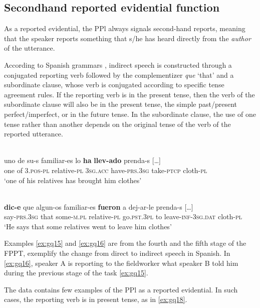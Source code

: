 \documentclass[output=paper]{langsci/langscibook}
\begin{document}
\subsection{Secondhand reported evidential function}\label{s:gq4-2}

As a reported evidential, the PPl always signals second-hand reports, meaning that the speaker reports something that s/he has heard directly from the \textit{author} of the utterance.

According to Spanish grammars \citep{Maldona1999}, indirect speech is constructed through a conjugated reporting verb followed by the complementizer \textit{que} ‘that’ and a subordinate clause, whose verb is conjugated according to specific tense agreement rules. If the reporting verb is in the present tense, then the verb of the subordinate clause will also be in the present tense, the simple past/present perfect/imperfect, or in the future tense. In the subordinate clause, the use of one tense rather than another depends on the original tense of the verb of the reported utterance.

\ea \label{ex:gq15}
\\
	\gll[…] uno de su-s familiar-es lo \textbf{ha} \textbf{llev-ado} prenda-s […]\\
	{} one of \textsc{3.pos}-\textsc{pl} relative-\textsc{pl} \textsc{3sg.acc} have-\textsc{prs.3sg} take-\textsc{ptcp} cloth-\textsc{pl} {}\\
	\glt ‘one of his relatives has brought him clothes’
\z	

\ea \label{ex:gq16}
\\
	\gll […] \textbf{dic-e} que algun-os familiar-es \textbf{fueron} a dej-ar-le prenda-s […]\\
	{} say-\textsc{prs.3sg} that some-\textsc{m.pl} relative-\textsc{pl} go.\textsc{pst.3pl} to leave-\textsc{inf-3sg.dat} cloth-\textsc{pl} {}\\
	\glt ‘He says that some relatives went to leave him clothes’
\z

Examples \ref{ex:gq15} and \ref{ex:gq16} are from the fourth and the fifth stage of the FPPT, exemplify the change from direct to indirect speech in Spanish. In \ref{ex:gq16}, speaker A is reporting to the fieldworker what speaker B told him during the previous stage of the task \ref{ex:gq15}.

The data contains few examples of the PPl as a reported evidential. In such cases, the reporting verb is in present tense, as in \ref{ex:gq18}. 
\end{document}
